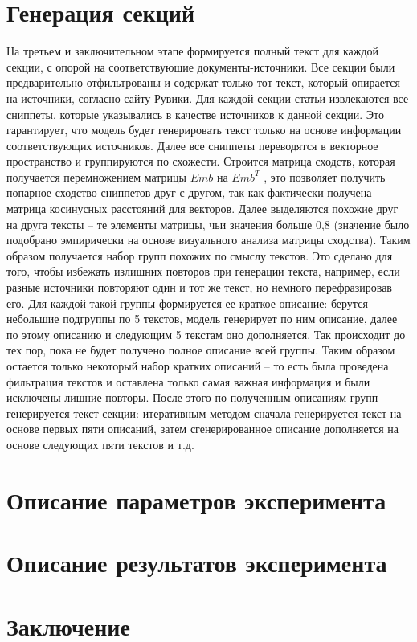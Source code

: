 \documentclass{article}
\theoremstyle{definition}
\theoremstyle{plain}
\begin{document}
\section*{Генерация секций}
На третьем и заключительном этапе формируется полный текст для каждой секции, с опорой на соответствующие документы-источники.
Все секции были предварительно отфильтрованы и содержат только тот текст, который опирается на источники, согласно сайту Рувики. 
Для каждой секции статьи извлекаются все сниппеты, которые указывались в качестве источников к данной секции. 
Это гарантирует, что модель будет генерировать текст только на основе информации соответствующих источников. 
Далее все сниппеты переводятся в векторное пространство и группируются по схожести. Строится матрица сходств, которая получается перемножением матрицы $ Emb $ на $ Emb^T $
, это позволяет получить попарное сходство сниппетов друг с другом, так как фактически получена матрица косинусных расстояний для векторов. 
Далее выделяются похожие друг на друга тексты – те элементы матрицы, чьи значения больше 0,8 (значение было подобрано эмпирически на основе визуального анализа матрицы сходства). 
Таким образом получается набор групп похожих по смыслу текстов. Это сделано для того, чтобы избежать излишних повторов при генерации текста, например, если разные источники повторяют один и тот же текст, но немного перефразировав его. 
Для каждой такой группы формируется ее краткое описание: берутся небольшие подгруппы по 5 текстов, модель генерирует по ним описание, далее по этому описанию и следующим 5 текстам оно дополняется. Так происходит до тех пор, пока не будет получено полное описание всей группы. 
Таким образом остается только некоторый набор кратких описаний – то есть была проведена фильтрация текстов и оставлена только самая важная информация и были исключены лишние повторы. После этого по полученным описаниям групп генерируется текст секции: итеративным методом сначала генерируется текст на основе первых пяти описаний, затем сгенерированное описание дополняется на основе следующих пяти текстов и т.д.
\section*{Описание параметров эксперимента}
\section*{Описание результатов эксперимента}
\section*{Заключение}
\end{document}

